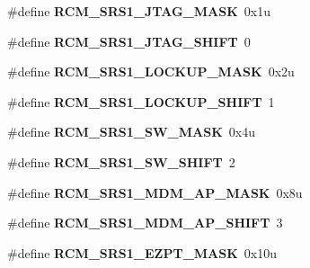 \begin{DoxyCompactItemize}
\item 
\#define {\bfseries R\+C\+M\+\_\+\+S\+R\+S1\+\_\+\+J\+T\+A\+G\+\_\+\+M\+A\+SK}~0x1u\hypertarget{group__RCM__Register__Masks_ga636e5479adb4c5dba899a740ca14af5f}{}\label{group__RCM__Register__Masks_ga636e5479adb4c5dba899a740ca14af5f}

\item 
\#define {\bfseries R\+C\+M\+\_\+\+S\+R\+S1\+\_\+\+J\+T\+A\+G\+\_\+\+S\+H\+I\+FT}~0\hypertarget{group__RCM__Register__Masks_ga1184957c2244e1d98aed4a802ca8534d}{}\label{group__RCM__Register__Masks_ga1184957c2244e1d98aed4a802ca8534d}

\item 
\#define {\bfseries R\+C\+M\+\_\+\+S\+R\+S1\+\_\+\+L\+O\+C\+K\+U\+P\+\_\+\+M\+A\+SK}~0x2u\hypertarget{group__RCM__Register__Masks_ga4f7c4ce64c13c55fc0c7aaea3a702a03}{}\label{group__RCM__Register__Masks_ga4f7c4ce64c13c55fc0c7aaea3a702a03}

\item 
\#define {\bfseries R\+C\+M\+\_\+\+S\+R\+S1\+\_\+\+L\+O\+C\+K\+U\+P\+\_\+\+S\+H\+I\+FT}~1\hypertarget{group__RCM__Register__Masks_ga71f857503a2b2d2e0c30d4762e89a8d8}{}\label{group__RCM__Register__Masks_ga71f857503a2b2d2e0c30d4762e89a8d8}

\item 
\#define {\bfseries R\+C\+M\+\_\+\+S\+R\+S1\+\_\+\+S\+W\+\_\+\+M\+A\+SK}~0x4u\hypertarget{group__RCM__Register__Masks_ga72f541acd2a0992ad0d1d089c694ad5f}{}\label{group__RCM__Register__Masks_ga72f541acd2a0992ad0d1d089c694ad5f}

\item 
\#define {\bfseries R\+C\+M\+\_\+\+S\+R\+S1\+\_\+\+S\+W\+\_\+\+S\+H\+I\+FT}~2\hypertarget{group__RCM__Register__Masks_ga7e554c1ae96dae684fbc81204283f86c}{}\label{group__RCM__Register__Masks_ga7e554c1ae96dae684fbc81204283f86c}

\item 
\#define {\bfseries R\+C\+M\+\_\+\+S\+R\+S1\+\_\+\+M\+D\+M\+\_\+\+A\+P\+\_\+\+M\+A\+SK}~0x8u\hypertarget{group__RCM__Register__Masks_ga6af4d8ed2135b602de575373f22b1af8}{}\label{group__RCM__Register__Masks_ga6af4d8ed2135b602de575373f22b1af8}

\item 
\#define {\bfseries R\+C\+M\+\_\+\+S\+R\+S1\+\_\+\+M\+D\+M\+\_\+\+A\+P\+\_\+\+S\+H\+I\+FT}~3\hypertarget{group__RCM__Register__Masks_ga91611da7546b27a939e92926f378229f}{}\label{group__RCM__Register__Masks_ga91611da7546b27a939e92926f378229f}

\item 
\#define {\bfseries R\+C\+M\+\_\+\+S\+R\+S1\+\_\+\+E\+Z\+P\+T\+\_\+\+M\+A\+SK}~0x10u\hypertarget{group__RCM__Register__Masks_gaaff7d7a53676535a98915b174b862435}{}\label{group__RCM__Register__Masks_gaaff7d7a53676535a98915b174b862435}


\end{DoxyCompactItemize}
